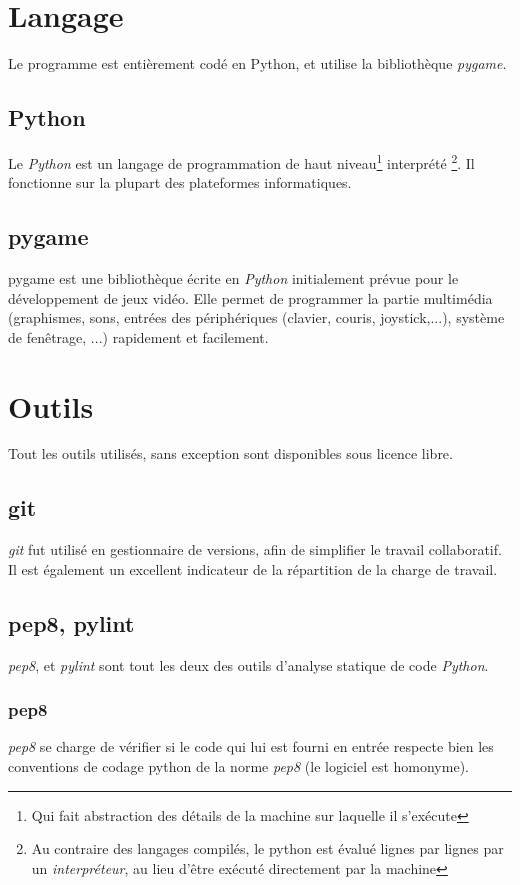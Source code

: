 \section{Langage}
    Le programme est entièrement codé en Python,
    et utilise la bibliothèque \emph{pygame}.
    \subsection{Python}
        Le \emph{Python} est un langage de programmation de haut niveau\footnote{Qui fait
        abstraction des détails de la machine sur laquelle il s'exécute} interprété
        \footnote{Au contraire des langages compilés, le python est évalué
        lignes par lignes par un \emph{interpréteur}, au lieu d'être exécuté directement
        par la machine}. Il fonctionne sur la plupart des plateformes informatiques.
    \subsection{pygame}
        pygame est une bibliothèque écrite en \emph{Python} initialement prévue pour
        le développement de jeux vidéo. Elle permet de programmer la partie multimédia
        (graphismes, sons, entrées des périphériques (clavier, couris, joystick,...),
        système de fenêtrage, ...) rapidement et facilement.

\section{Outils}
    Tout les outils utilisés, sans exception sont disponibles sous
    licence libre.
    \subsection{git}
        \emph{git} fut utilisé en gestionnaire de versions,
        afin de simplifier le travail collaboratif.
        Il est également un excellent indicateur de la répartition
        de la charge de travail.
    \subsection{pep8, pylint}
        \emph{pep8}, et \emph{pylint} sont tout les deux
        des outils d'analyse statique de code \emph{Python}.
        \subsubsection{pep8}
            \emph{pep8} se charge de vérifier si le code qui lui
            est fourni en entrée respecte bien les conventions de codage
            python de la norme \emph{pep8} (le logiciel est homonyme).
